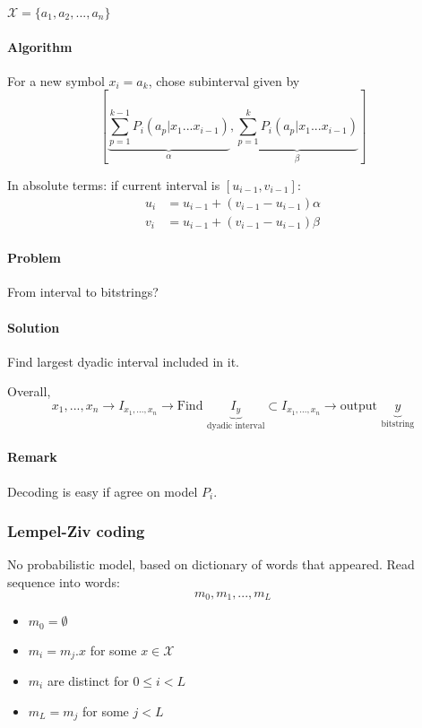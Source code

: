 $\mathcal{X}=\{ a_1, a_2,...,a_n\}$

\paragraph{Algorithm} For a new symbol \emph{$x_i=a_k$}, chose subinterval given by
\[ \left[ \underbrace{\sum_{p=1}^{k-1} P_i(a_p | x_1 ... x_{i-1})}_{\alpha}, \underbrace{\sum_{p=1}^{k} P_i(a_p|x_1 ... x_{i-1})}_{\beta}\right]\]


In absolute terms: if current interval is $[u_{i-1}, v_{i-1}]$:
\begin{align*}
u_i & = u_{i-1} + (v_{i-1}-u_{i-1})\alpha\\
v_{i} & = u_{i-1} + (v_{i-1}-u_{i-1})\beta
\end{align*}

\paragraph{Problem} From interval to bitstrings?

\paragraph{Solution} Find largest dyadic interval included in it.

Overall,
\[x_1,...,x_n \to I_{x_1,...,x_n} \to \text{Find } \underbrace{I_y}_{\text{dyadic interval}} \subset I_{x_1,...,x_n} \to \text{output } \underbrace{y}_{\text{bitstring}} \]

\paragraph{Remark} Decoding is easy if agree on model $P_i$.


\subsubsection{Lempel-Ziv coding}
No probabilistic model, based on dictionary of words that appeared. Read sequence into words:
\[m_0,m_1,...,m_L\]

\begin{itemize}
\item $m_0=\emptyset$
\item $m_i=m_{j}.x$ for some $x\in \mathcal{X}$
\item $m_i$ are distinct for $0\leq i < L$
\item $m_L=m_j$ for some $j<L$
\end{itemize}

